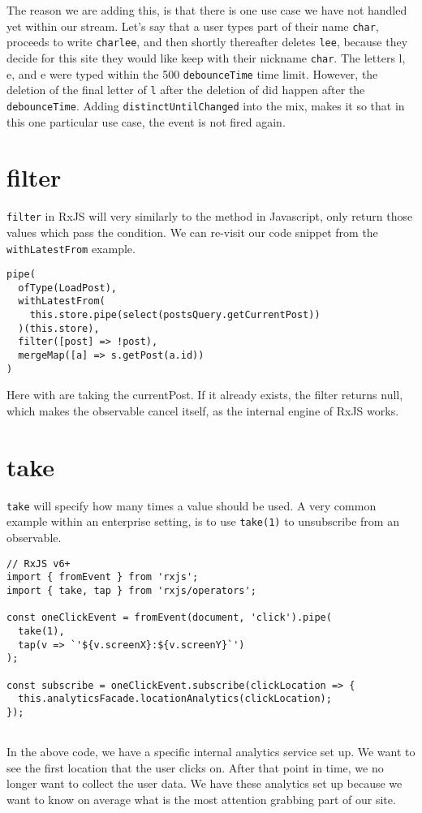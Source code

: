 The reason we are adding this, is that there is one use case we have not
handled yet within our stream. Let's say that a user types part of their 
name \texttt{char}, proceeds to write \texttt{charlee}, and then shortly
thereafter deletes \texttt{lee}, because they decide for this site they 
would like keep with their nickname \texttt{char}. The letters l, e, and
e were typed within the 500 \lstinline{debounceTime} time limit. However, 
the deletion of the final letter of \texttt{l} after the deletion of 
 did happen after the \lstinline{debounceTime}. Adding 
\lstinline{distinctUntilChanged} into the mix, makes it so that in this one 
particular use case, the event is not fired again. 

\section{filter} 
\lstinline{filter} in RxJS will very similarly to the method in Javascript, 
only return those values which pass the condition. We can re-visit our code
snippet from the \lstinline{withLatestFrom} example.

\begin{lstlisting}[caption=data-access-post.ts]
pipe(
  ofType(LoadPost),
  withLatestFrom(
    this.store.pipe(select(postsQuery.getCurrentPost))
  )(this.store),
  filter([post] => !post),
  mergeMap([a] => s.getPost(a.id))
)
\end{lstlisting}  

Here with are taking the currentPost. If it already exists, the filter 
returns null, which makes the observable cancel itself, as the internal 
engine of RxJS works.

\section{take} 
\lstinline{take} will specify how many times a value should be used. A 
very common example within an enterprise setting, is to use          \lstinline{take(1)}
to unsubscribe from an observable. 

\begin{lstlisting}
// RxJS v6+
import { fromEvent } from 'rxjs';
import { take, tap } from 'rxjs/operators';

const oneClickEvent = fromEvent(document, 'click').pipe(
  take(1),
  tap(v => `'${v.screenX}:${v.screenY}`')
);

const subscribe = oneClickEvent.subscribe(clickLocation => {
  this.analyticsFacade.locationAnalytics(clickLocation);
});
  
\end{lstlisting}
In the above code, we have a specific internal analytics service set up. We 
want to see the first location that the user clicks on. After that point in 
time, we no longer want to collect the user data. We have these analytics set 
up because we want to know on average what is the most attention grabbing part
of our site.

